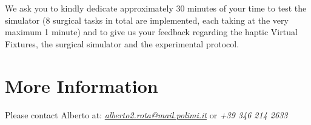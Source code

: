 \documentclass{article}
\begin{document}
\noindent We ask you to kindly dedicate approximately 30 minutes of your time to test the simulator (8 surgical tasks in total are implemented, each taking at the very maximum 1 minute) and to give us your feedback regarding the haptic Virtual Fixtures, the surgical simulator and the experimental protocol.

\section{More Information}
Please contact Alberto at: \textit{\href{mailto:alberto2.rota@mail.polimi.it}{alberto2.rota@mail.polimi.it}} or \textit{+39 346 214 2633}


\end{document}
